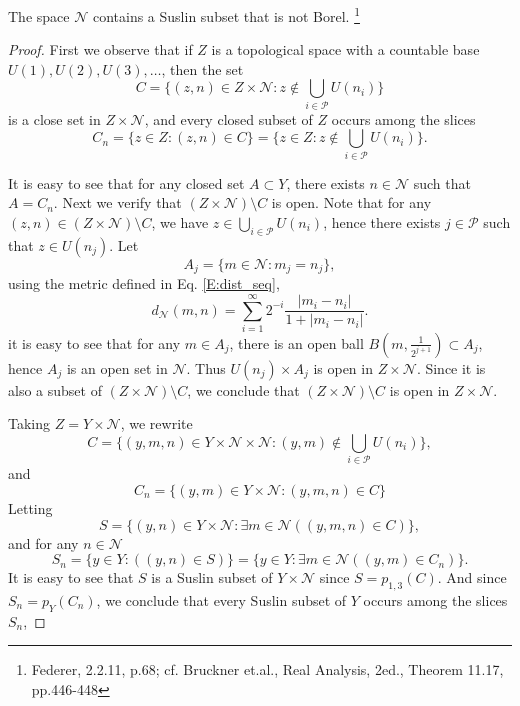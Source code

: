 \begin{theorem}
  The space $\mathcal{N}$ contains a Suslin subset that is not Borel.
  \footnote{Federer, 2.2.11, p.68;
    cf. Bruckner et.al., Real Analysis, 2ed., Theorem 11.17, pp.446-448}
\end{theorem}
\begin{proof}
First we observe that if $Z$ is a topological space with a countable base 
$U(1),U(2),U(3),\dots$, then the set
\[
  C=\{(z,n)\in Z\times\mathcal{N}: z\notin \bigcup_{i\in\mathcal{P}} U(n_i) \}
\]
is a close set in $Z\times\mathcal{N}$, and every closed subset of $Z$ occurs
among the slices
\[
  C_n = \{ z\in Z: (z,n)\in C \}
      = \{ z\in Z: z\notin \bigcup_{i\in\mathcal{P}} U(n_i) \}.
\]

It is easy to see that for any closed set $A\subset Y$, there exists
$n\in \mathcal{N}$ such that $A=C_n$.
Next we verify that $(Z\times\mathcal{N})\setminus C$ is open.
Note that for any $(z,n)\in (Z\times\mathcal{N})\setminus C$, we have
$z\in\bigcup_{i\in\mathcal{P}} U(n_i)$, hence there exists $j\in\mathcal{P}$
such that $z\in U(n_j)$.
Let
\[
  A_j=\{m\in\mathcal{N}: m_j=n_j\},
\]
using the metric defined in Eq. \ref{E:dist_seq}, 
\[
	d_{\mathcal{N}}(m,n) 
	  = \sum_{i=1}^{\infty} 2^{-i} \frac{|m_i-n_i|}{1+|m_i-n_i|}.
\]
it is easy to see that for any $m\in A_j$, there is an open ball
$B(m,\frac{1}{2^{j+1}})\subset A_j$, hence $A_j$ is an open set in 
$\mathcal{N}$. Thus $U(n_j)\times A_j$ is open in $Z\times\mathcal{N}$. 
Since it is also a subset of $(Z\times\mathcal{N})\setminus C$, we 
conclude that $(Z\times\mathcal{N})\setminus C$ is open in 
$Z\times\mathcal{N}$.

Taking $Z=Y\times\mathcal{N}$, we rewrite
\[
  C=\{(y,m,n)\in Y\times\mathcal{N}\times\mathcal{N}:
    (y,m)\notin \bigcup_{i\in\mathcal{P}} U(n_i) \},
\]
and
\[
  C_n = \{ (y,m)\in Y\times\mathcal{N}: (y,m,n)\in C \}
\]
Letting
\[
  S = \{(y,n)\in Y\times\mathcal{N}: \exists m\in\mathcal{N} ((y,m,n)\in C) \},
\]
and for any $n\in\mathcal{N}$
\[
  S_n = \{ y\in Y: ((y,n)\in S) \}
      = \{ y\in Y: \exists m\in\mathcal{N} ((y,m)\in C_n) \}.
\]
It is easy to see that $S$ is a Suslin subset of  $Y\times\mathcal{N}$
since $S=p_{1,3}(C)$. And since $S_n=p_Y(C_n)$,
we conclude that every Suslin subset of $Y$ occurs among the slices $S_n$, 


\end{proof}
